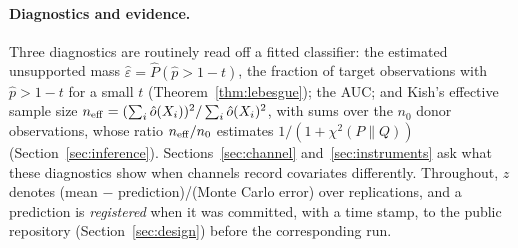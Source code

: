 \paragraph{Diagnostics and evidence.} Three diagnostics are routinely read off a fitted classifier: the estimated unsupported mass $\hat\varepsilon=\hat P(\hat p>1-t)$, the fraction of target observations with $\hat p>1-t$ for a small $t$ (Theorem~\ref{thm:lebesgue}); the AUC; and Kish's \citeyearpar{kish1965} effective sample size $n_{\mathrm{eff}}=(\sum_i\hat o(X_i))^2/\sum_i\hat o(X_i)^2$, with sums over the $n_0$ donor observations, whose ratio $n_{\mathrm{eff}}/n_0$ estimates $1/(1+\chi^2(P\|Q))$ (Section~\ref{sec:inference}). Sections~\ref{sec:channel} and~\ref{sec:instruments} ask what these diagnostics show when channels record covariates differently. Throughout, $z$ denotes (mean $-$ prediction)/(Monte Carlo error) over replications, and a prediction is \emph{registered} when it was committed, with a time stamp, to the public repository (Section~\ref{sec:design}) before the corresponding run.
